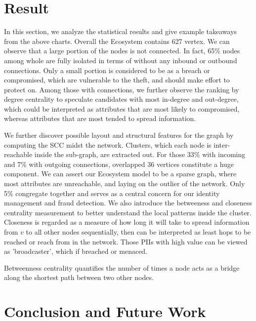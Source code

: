 \documentclass[letterpaper, 10 pt, conference]{ieeeconf}  %
\begin{document}
\section{Result}
In this section, we analyze the statistical results and give example takeaways from the above charts. Overall the Ecosystem contains 627 vertex. We  can  observe  that  a  large portion  of  the  nodes  is not  connected.  In  fact,  65\%  nodes among  whole  are  fully  isolated  in  terms  of  without  any inbound  or  outbound  connections.  Only  a  small  portion  is considered  to  be  as  a  breach  or  compromised,  which  are vulnerable  to  the  theft,  and should  make  effort  to  protect on. Among those with connections, we further observe the ranking by degree centrality to speculate candidates with most in-degree and out-degree, which could be interpreted as attributes that are most likely to compromised, whereas attributes that are most tended to spread information. 

We further discover possible layout and structural features for the graph by computing the SCC midst the network. Clusters, which each node is inter-reachable inside the sub-graph, are extracted out. For those 33\% with incoming and 7\% with outgoing connections, overlapped 36 vertices constitute a huge component. 
We can assert our Ecosystem model to be a sparse graph, where most attributes are unreachable, and laying on the outlier of the network. Only 5\% congregate together and serves as a central concern for our identity management and fraud detection.
We also introduce the betweeness and closeness centrality measurement to better understand the local patterns inside the cluster. Closeness is regarded as a measure of how long it will take to spread information from $v$ to all other nodes sequentially, then can be interpreted as least hops to be reached or reach from in the network. Those PIIs with high value can be viewed as 'broadcaster', which if breached or menaced.

Betweenness centrality quantifies the number of times a node
acts as a bridge along the shortest path between two other
nodes.


\section{Conclusion and Future Work}
\end{document}
